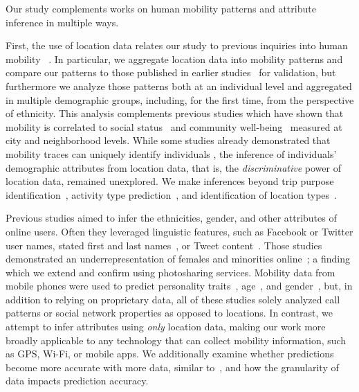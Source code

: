 Our study complements works on human mobility patterns and attribute inference in multiple ways. 

% 
First, the use of location data relates our study to previous inquiries into human mobility ~\cite{Cho:2011io,Gonzalez:2008wy,ICWSM112831}. In particular, we aggregate location data into mobility patterns and compare our patterns to those published in earlier studies~\cite{Becker:2013ci,Isaacman:2011cn,Isaacman:2010en} for validation, but furthermore we analyze those patterns both at an individual level and aggregated in multiple demographic groups, including, for the first time, from the perspective of ethnicity. This analysis complements previous studies which have shown that mobility is correlated to social status~\cite{ICWSM112783} and community well-being~\cite{LathiaQC12} measured at city and neighborhood levels. 
While some studies already demonstrated that mobility traces can uniquely identify individuals \cite{de2013unique,song2010limits}, the inference of individuals' demographic attributes from location data, that is, the \emph{discriminative} power of location data, remained unexplored. 
We make inferences beyond trip purpose identification~\cite{doi:10.1061/41123(383)73}, activity type prediction~\cite{liao07extracting,liu13annotating}, and identification of location types~\cite{Isaacman:2011un}. 

% 
Previous studies aimed to infer the ethnicities, gender, and other attributes of online users. Often they leveraged linguistic features, such as Facebook or Twitter user names, stated first and last names~\cite{ICWSM101534,mislove-2011-twitter}, or Tweet content~\cite{ICWSM112886,Rao:2010:CLU:1871985.1871993}. Those studies demonstrated an underrepresentation of females and minorities online~\cite{mislove-2011-twitter}; a finding which we extend and confirm using photosharing services. Mobility data from mobile phones were used to predict personality traits~\cite{deMontjoye:2013:PPU:2456485.2456492}, age~\cite{Brea:el}, and gender~\cite{Sarraute:2014ka}, but, in addition to relying on proprietary data, all of these studies solely analyzed call patterns or social network properties as opposed to locations. In contrast, we attempt to infer attributes using \emph{only} location data, making our work more broadly applicable to any technology that can collect mobility information, such as GPS, Wi-Fi, or mobile apps. We additionally examine whether predictions become more accurate with more data, similar to~\cite{AltshulerAFEP12}, and how the granularity of data impacts prediction accuracy.

